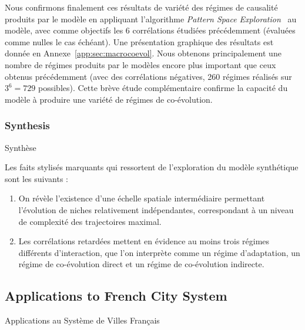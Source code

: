 


Nous confirmons finalement ces résultats de variété des régimes de causalité produits par le modèle en appliquant l'algorithme \emph{Pattern Space Exploration}~\cite{10.1371/journal.pone.0138212} au modèle, avec comme objectifs les 6 corrélations étudiées précédemment (évaluées comme nulles le cas échéant). Une présentation graphique des résultats est donnée en Annexe~\ref{app:sec:macrocoevol}. Nous obtenons principalement une nombre de régimes produits par le modèles encore plus important que ceux obtenus précédemment (avec des corrélations négatives, 260 régimes réalisés sur $3^6 = 729$ possibles). Cette brève étude complémentaire confirme la capacité du modèle à produire une variété de régimes de co-évolution.




\subsubsection{Synthesis}{Synthèse}

Les faits stylisés marquants qui ressortent de l'exploration du modèle synthétique sont les suivants :

\begin{enumerate}
	\item On révèle l'existence d'une échelle spatiale intermédiaire permettant l'évolution de niches relativement indépendantes, correspondant à un niveau de complexité des trajectoires maximal.
	\item Les corrélations retardées mettent en évidence au moins trois régimes différents d'interaction, que l'on interprète comme un régime d'adaptation, un régime de co-évolution direct et un régime de co-évolution indirecte.
\end{enumerate}




\subsection{Applications to French City System}{Applications au Système de Villes Français}



